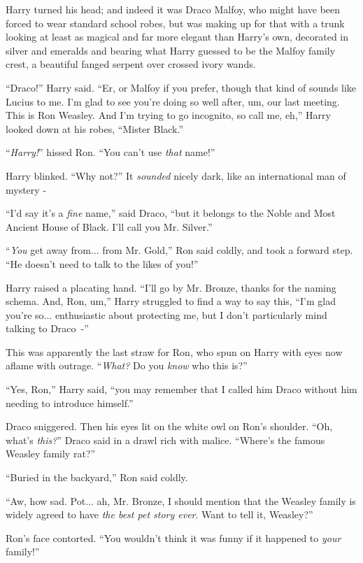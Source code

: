 Harry turned his head; and indeed it was Draco Malfoy, who might have been forced to wear standard school robes, but was making up for that with a trunk looking at least as magical and far more elegant than Harry's own, decorated in silver and emeralds and bearing what Harry guessed to be the Malfoy family crest, a beautiful fanged serpent over crossed ivory wands.

``Draco!'' Harry said. ``Er, or Malfoy if you prefer, though that kind of sounds like Lucius to me. I'm glad to see you're doing so well after, um, our last meeting. This is Ron Weasley. And I'm trying to go incognito, so call me, eh,'' Harry looked down at his robes, ``Mister Black.''

``\emph{Harry!}'' hissed Ron. ``You can't use \emph{that} name!''

Harry blinked. ``Why not?'' It \emph{sounded} nicely dark, like an international man of mystery -

``I'd say it's a \emph{fine} name,'' said Draco, ``but it belongs to the Noble and Most Ancient House of Black. I'll call you Mr. Silver.''

``\emph{You} get away from... from Mr. Gold,'' Ron said coldly, and took a forward step. ``He doesn't need to talk to the likes of you!''

Harry raised a placating hand. ``I'll go by Mr. Bronze, thanks for the naming schema. And, Ron, um,'' Harry struggled to find a way to say this, ``I'm glad you're so... enthusiastic about protecting me, but I don't particularly mind talking to Draco~-''

This was apparently the last straw for Ron, who spun on Harry with eyes now aflame with outrage. ``\emph{What?} Do you \emph{know} who this is?''

``Yes, Ron,'' Harry said, ``you may remember that I called him Draco without him needing to introduce himself.''

Draco sniggered. Then his eyes lit on the white owl on Ron's shoulder. ``Oh, what's \emph{this?}'' Draco said in a drawl rich with malice. ``Where's the famous Weasley family rat?''

``Buried in the backyard,'' Ron said coldly.

``Aw, how sad. Pot... ah, Mr. Bronze, I should mention that the Weasley family is widely agreed to have \emph{the best pet story ever}. Want to tell it, Weasley?''

Ron's face contorted. ``You wouldn't think it was funny if it happened to \emph{your} family!''

